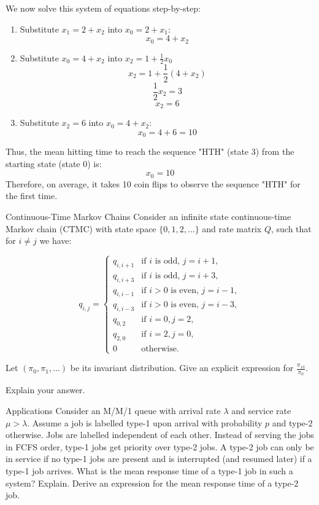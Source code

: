 \begin{solution}
  We now solve this system of equations step-by-step:

  \begin{enumerate}
    \item Substitute \( x_1 = 2 + x_2 \) into \( x_0 = 2 + x_1 \):
      \[
        x_0 = 4 + x_2
      \]
    \item Substitute \( x_0 = 4 + x_2 \) into \( x_2 = 1 + \frac{1}{2}x_0 \)
      \[
        x_2 = 1 + \frac{1}{2}\left( 4 + x_2 \right)
      \]
      \[
        \frac{1}{2}x_2 = 3
      \]
      \[
        x_2 = 6
      \]
    \item Substitute \( x_2 = 6 \) into \( x_0 = 4 + x_2 \):
      \[
        x_0 = 4 + 6 = 10
      \]
  \end{enumerate}

  Thus, the mean hitting time to reach the sequence "HTH" (state 3) from the starting state (state 0) is:
  \[
  \boxed{x_0 = 10}
  \]
  Therefore, on average, it takes 10 coin flips to observe the sequence "HTH" for the first time.
\end{solution}

\begin{problem}{Continuous-Time Markov Chains}
Consider an infinite state continuous-time Markov chain (CTMC) with state space $\{0, 1, 2, \ldots\}$ and rate matrix $Q$, such that for $i \neq j$ we have:

\[
q_{i,j} =
\begin{cases}
    q_{i,i+1} & \text{if } i \text{ is odd, } j = i + 1, \\
    q_{i,i+3} & \text{if } i \text{ is odd, } j = i + 3, \\
    q_{i,i-1} & \text{if } i > 0 \text{ is even, } j = i - 1, \\
    q_{i,i-3} & \text{if } i > 0 \text{ is even, } j = i - 3, \\
    q_{0,2} & \text{if } i = 0, j = 2, \\
    q_{2,0} & \text{if } i = 2, j = 0, \\
    0 & \text{otherwise.}
\end{cases}
\]

Let $(\pi_0, \pi_1, \ldots)$ be its invariant distribution. Give an explicit expression for $\frac{\pi_{13}}{\pi_0}$. 

Explain your answer.
\end{problem}

\begin{problem}{Applications}
    Consider an M/M/1 queue with arrival rate $\lambda$ and service rate $\mu > \lambda$. Assume a job is labelled type-1 upon arrival with probability $p$ and type-2 otherwise. Jobs are labelled independent of each other. Instead of serving the jobs in FCFS order, type-1 jobs get priority over type-2 jobs. A type-2 job can only be in service if no type-1 jobs are present and is interrupted (and resumed later) if a type-1 job arrives. What is the mean response time of a type-1 job in such a system? Explain. Derive an expression for the mean response time of a type-2 job.
\end{problem}

